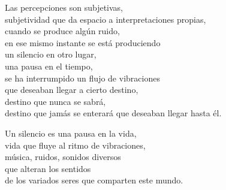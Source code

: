 \begin{center}
\vspace{1em}
Las percepciones son subjetivas,\\
subjetividad que da espacio a interpretaciones propias,\\
cuando se produce algún ruido,\\
en ese mismo instante se está produciendo\\ 
un silencio en otro lugar,\\
una pausa en el tiempo,\\
se ha interrumpido un flujo de vibraciones\\ 
que deseaban llegar a cierto destino,\\
destino que nunca se sabrá,\\
destino que jamás se enterará que deseaban llegar hasta él.

\vspace{1em}
Un silencio es una pausa en la vida,\\
vida que fluye al ritmo de vibraciones,\\
música, ruidos, sonidos diversos\\
que alteran los sentidos\\ 
de los variados seres que comparten este mundo.


\end{center}




